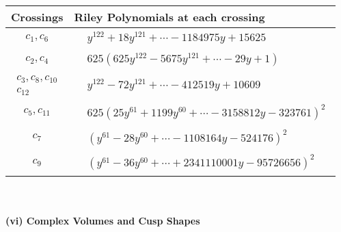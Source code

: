 \documentclass[1p]{elsarticle_modified}
\theoremstyle{definition}
\begin{document}
\begin{tabular}{m{50pt}|m{274pt}}
Crossings & \hspace{64pt}Riley Polynomials at each crossing \\
\hline $$\begin{aligned}c_{1},c_{6}\end{aligned}$$&$\begin{aligned}
&y^{122}+18 y^{121}+\cdots-1184975 y+15625
\end{aligned}$\\
\hline $$\begin{aligned}c_{2},c_{4}\end{aligned}$$&$\begin{aligned}
&625(625 y^{122}-5675 y^{121}+\cdots-29 y+1)
\end{aligned}$\\
\hline $$\begin{aligned}c_{3},c_{8},c_{10}\\c_{12}\end{aligned}$$&$\begin{aligned}
&y^{122}-72 y^{121}+\cdots-412519 y+10609
\end{aligned}$\\
\hline $$\begin{aligned}c_{5},c_{11}\end{aligned}$$&$\begin{aligned}
&625(25 y^{61}+1199 y^{60}+\cdots-3158812 y-323761)^{2}
\end{aligned}$\\
\hline $$\begin{aligned}c_{7}\end{aligned}$$&$\begin{aligned}
&(y^{61}-28 y^{60}+\cdots-1108164 y-524176)^{2}
\end{aligned}$\\
\hline $$\begin{aligned}c_{9}\end{aligned}$$&$\begin{aligned}
&(y^{61}-36 y^{60}+\cdots+2341110001 y-95726656)^{2}
\end{aligned}$\\
\hline
\end{tabular}\\~\\
\newpage\flushleft \textbf{(vi) Complex Volumes and Cusp Shapes}
\end{document}
